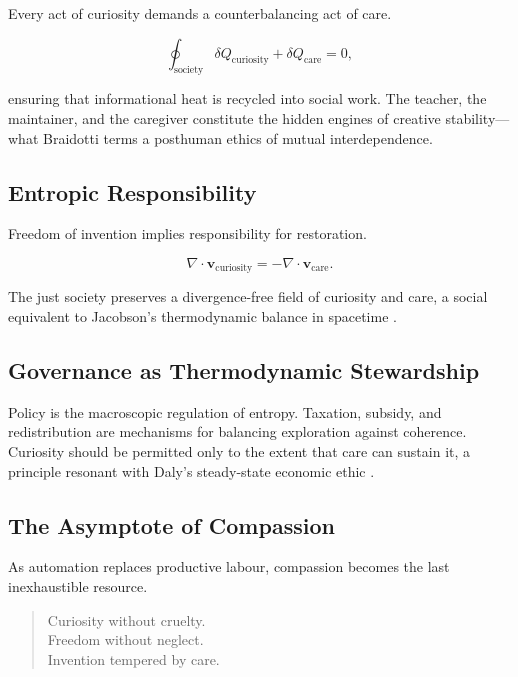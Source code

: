 \documentclass[12pt,a4paper]{article}
\begin{document}
Every act of curiosity demands a counterbalancing act of care.

\begin{equation}
\oint_{\text{society}} \delta Q_{\text{curiosity}}
+ \delta Q_{\text{care}} = 0,
\end{equation}

ensuring that informational heat is recycled into social work.  
The teacher, the maintainer, and the caregiver constitute 
the hidden engines of creative stability---what Braidotti \citep{braidotti2017posthuman} 
terms a posthuman ethics of mutual interdependence.

\subsection{Entropic Responsibility}

Freedom of invention implies responsibility for restoration.

\[
\nabla \cdot \mathbf{v}_{\text{curiosity}} =
-\nabla \cdot \mathbf{v}_{\text{care}}.
\]

The just society preserves a divergence-free field of curiosity and care, 
a social equivalent to Jacobson’s thermodynamic balance in spacetime 
\citep{jacobson1995thermodynamics}.

\subsection{Governance as Thermodynamic Stewardship}

Policy is the macroscopic regulation of entropy.
Taxation, subsidy, and redistribution 
are mechanisms for balancing exploration against coherence.
Curiosity should be permitted only to the extent that care can sustain it,
a principle resonant with Daly’s steady-state economic ethic 
\citep{daly1977steady,foster2020steady}.

\subsection{The Asymptote of Compassion}

As automation replaces productive labour, compassion becomes 
the last inexhaustible resource.
\begin{quote}
Curiosity without cruelty.\\
Freedom without neglect.\\
Invention tempered by care.
\end{quote}
\end{document}
